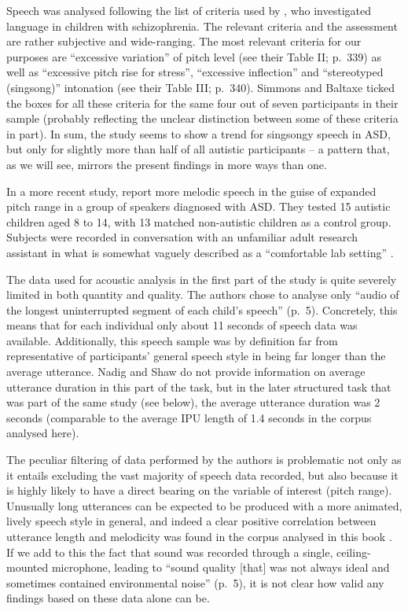 Speech was analysed following the list of criteria used by \citet{goldfarbSpeechLanguageFaults1972}, who investigated language in children with schizophrenia. The relevant criteria and the assessment are rather subjective \citep[as acknowledged by][]{simmonsLanguagePatternsAdolescent1975} and wide-ranging. The most relevant criteria for our purposes are ``excessive variation'' of pitch level (see their Table II; p.~339) as well as ``excessive pitch rise for stress'', ``excessive inflection'' and ``stereotyped (singsong)'' intonation (see their Table III; p.~340). Simmons and Baltaxe ticked the boxes for all these criteria for the same four out of seven participants in their sample (probably reflecting the unclear distinction between some of these criteria in part). In sum, the study seems to show a trend for singsongy speech in ASD, but only for slightly more than half of all autistic participants -- a pattern that, as we will see, mirrors the present findings in more ways than one.

 In a more recent study, \citet{nadigAcousticPerceptualMeasurement2012} report more melodic speech in the guise of expanded pitch range in a group of speakers diagnosed with ASD. They tested 15 autistic children aged 8 to 14, with 13 matched non-autistic children as a control group. Subjects were recorded in conversation with an unfamiliar adult research assistant in what is somewhat vaguely described as a ``comfortable lab setting'' \citep[p. 4]{nadigAcousticPerceptualMeasurement2012}.

 The data used for acoustic analysis in the first part of the study is quite severely limited in both quantity and quality. The authors chose to analyse only ``audio of the longest uninterrupted segment of each child's speech'' (p.~5). Concretely, this means that for each individual only about 11 seconds of speech data was available. Additionally, this speech sample was by definition far from representative of participants' general speech style in being far longer than the average utterance. Nadig and Shaw do not provide information on average utterance duration in this part of the task, but in the later structured task that was part of the same study (see below), the average utterance duration was 2 seconds (comparable to the average IPU length of 1.4 seconds in the corpus analysed here).

 The peculiar filtering of data performed by the authors is problematic not only as it entails excluding the vast majority of speech data recorded, but also because it is highly likely to have a direct bearing on the variable of interest (pitch range). Unusually long utterances can be expected to be produced with a more animated, lively speech style in general, and indeed a clear positive correlation between utterance length and melodicity was found in the corpus analysed in this book \citep[see also][]{demoraesIntonation1998,cooperFundamental1981}. If we add to this the fact that sound was recorded through a single, ceiling-mounted microphone, leading to ``sound quality {[}that{]} was not always ideal and sometimes contained environmental noise'' (p.~5), it is not clear how valid any findings based on these data alone can be.
 
